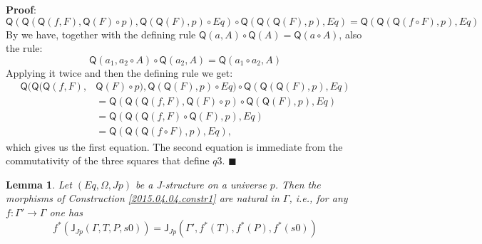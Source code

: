 \documentclass[12pt]{article}
\numberwithin{equation}{section}
\newenvironment{eq}{\begin{equation}}{\end{equation}}
\newenvironment{myproof}{{\bf Proof}:}{$\blacksquare$ \vskip 5mm }
\newtheorem{lemma}[proposition]{Lemma}
\newcommand{\llabel}[1]{\label{#1}}
\newcommand{\sr}{\rightarrow}
\newcommand{\J}{\mathsf{J}}
\newcommand{\Q}{\mathsf{Q}}
\begin{document}
\begin{myproof}
%
$$\Q(\Q(\Q(f,F),\Q(F)\circ p),\Q(\Q(F),p)\circ Eq)\circ \Q(\Q(\Q(F),p),Eq)=\Q(\Q(\Q(f\circ
F),p),Eq)$$
%
By \cite[Lemma 3.2]{fromunivwithPi} we have, together with the defining rule
$\Q(a,A)\circ \Q(A)=\Q(a\circ A)$, also the rule:
%
$$\Q(a_1,a_2\circ A)\circ \Q(a_2,A)=\Q(a_1\circ a_2, A)$$
%
Applying it twice and then the defining rule we get:
%
\begin{align*}
  \Q(\Q(\Q(f,F),&\Q(F)\circ p),\Q(\Q(F),p)\circ Eq)\circ \Q(\Q(\Q(F),p),Eq) \\
    & = \Q(\Q(\Q(f,F),\Q(F)\circ p)\circ \Q(\Q(F),p), Eq) \\
    & = \Q(\Q(\Q(f,F)\circ \Q(F),p),Eq) \\
    & = \Q(\Q(\Q(f\circ F),p),Eq),
\end{align*}
%
which gives us the first equation. The second equation is immediate from the
commutativity of the three squares that define $q3$.
\end{myproof}
%
\begin{lemma}
\llabel{2015.04.04.l1} Let $(Eq,\Omega,Jp)$ be a J-structure on a universe
$p$. Then the morphisms of Construction \ref{2015.04.04.constr1} are natural in
$\Gamma$, i.e., for any $f:\Gamma'\sr \Gamma$ one has
%
\begin{eq}\llabel{2015.04.04.eq3}
f^*(\J_{Jp}(\Gamma,T,P,s0))=\J_{Jp}(\Gamma',f^*(T),f^*(P),f^*(s0))
\end{eq}%
%
\end{lemma}
%
\end{document}
